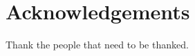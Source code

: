 \newpage
\thispagestyle{plain}
\chapter*{Acknowledgements}

Thank the people that need to be thanked.

\cleardoublepage
